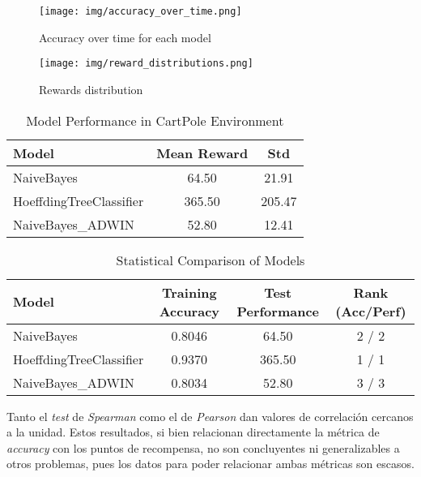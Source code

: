 \documentclass[12pt,letterpaper]{article}
\begin{document}
\begin{figure}[htp]
    \centering
    \texttt{[image: img/accuracy\_over\_time.png]}
    \caption{Accuracy over time for each model}
    \label{fig:accuracy_over_time}
\end{figure}

\begin{figure}[htp]
    \centering
    \texttt{[image: img/reward\_distributions.png]}
    \caption{Rewards distribution}
    \label{fig:reward_dist}
\end{figure}

\begin{table}[htp]
    \centering
    \begin{tabular}{lcc}
        \toprule
        Model                   & Mean Reward & Std    \\
        \midrule
        NaiveBayes              & 64.50       & 21.91  \\
        HoeffdingTreeClassifier & 365.50      & 205.47 \\
        NaiveBayes\_ADWIN       & 52.80       & 12.41  \\
        \bottomrule
    \end{tabular}
    \caption{Model Performance in CartPole Environment}
    \label{tab:reward}
\end{table}

\begin{table}[htp]
    \centering
    \begin{tabular}{lccc}
        \toprule
        Model                   & Training Accuracy & Test Performance & Rank (Acc/Perf) \\
        \midrule
        NaiveBayes              & 0.8046            & 64.50            & 2 / 2           \\
        HoeffdingTreeClassifier & 0.9370            & 365.50           & 1 / 1           \\
        NaiveBayes\_ADWIN       & 0.8034            & 52.80            & 3 / 3           \\
        \bottomrule
    \end{tabular}
    \caption{Statistical Comparison of Models}
    \label{tab:ranking}
\end{table}

Tanto el \textit{test} de \textit{Spearman} como el de \textit{Pearson} dan valores de correlación cercanos a la unidad. Estos resultados, si bien relacionan directamente la métrica de \textit{accuracy} con los puntos de recompensa, no son concluyentes ni generalizables a otros problemas, pues los datos para poder relacionar ambas métricas son escasos.
\end{document}
